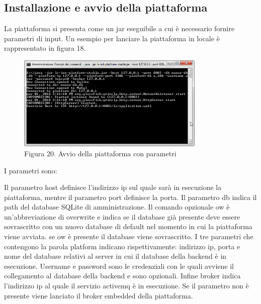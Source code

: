 \subsection{Installazione e avvio della piattaforma}
La piattaforma si presenta come un jar eseguibile a cui è necessario fornire parametri di input. Un esempio per lanciare la piattaforma in locale è rappresentato in figura 18.
\begin{figure}[h]
			\centering
			\includegraphics[width=0.8\textwidth]{lancio-piattaforma.png}
			\caption*{Figura 20. Avvio della piattaforma con parametri}
\end{figure}

I parametri sono:
{\selectfont
	
}
Il parametro host definisce l'indirizzo ip sul quale sarà in esecuzione la piattaforma, mentre il parametro port definisce la porta.
Il parametro db indica il path del database SQLite di amministrazione. Il comando opzionale ow è un'abbreviazione di overwrite e indica se il database già presente deve essere sovrascritto con un nuovo database di default nel momento in cui la piattaforma viene avviata. se ow è presente il database viene sovrascritto.
I tre parametri che contengono la parola platform indicano rispettivamente: indirizzo ip, porta e nome del database relativi al server in cui il database della backend è in esecuzione.
Username e password sono le credenziali con le quali avviene il collegamento al database della backend e sono opzionali. Infine broker indica l'indirizzo ip al quale il servizio activemq è in esecuzione. Se il parametro non è presente viene lanciato il broker embedded della piattaforma.
